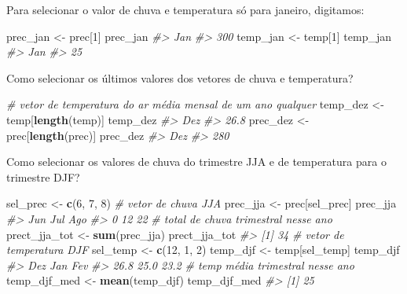 \documentclass[]{book}
\newenvironment{Shaded}{\begin{snugshade}}{\end{snugshade}}
\newcommand{\KeywordTok}[1]{\textcolor[rgb]{0.13,0.29,0.53}{\textbf{#1}}}
\newcommand{\DecValTok}[1]{\textcolor[rgb]{0.00,0.00,0.81}{#1}}
\newcommand{\StringTok}[1]{\textcolor[rgb]{0.31,0.60,0.02}{#1}}
\newcommand{\CommentTok}[1]{\textcolor[rgb]{0.56,0.35,0.01}{\textit{#1}}}
\newcommand{\NormalTok}[1]{#1}
\begin{document}
Para selecionar o valor de chuva e temperatura só para janeiro,
digitamos:

\begin{Shaded}
\begin{Highlighting}[]
\NormalTok{prec_jan <-}\StringTok{ }\NormalTok{prec[}\DecValTok{1}\NormalTok{]}
\NormalTok{prec_jan}
\CommentTok{#> Jan }
\CommentTok{#> 300}
\NormalTok{temp_jan <-}\StringTok{ }\NormalTok{temp[}\DecValTok{1}\NormalTok{]}
\NormalTok{temp_jan}
\CommentTok{#> Jan }
\CommentTok{#>  25}
\end{Highlighting}
\end{Shaded}

Como selecionar os últimos valores dos vetores de chuva e temperatura?

\begin{Shaded}
\begin{Highlighting}[]
\CommentTok{# vetor de temperatura do ar média mensal de um ano qualquer}
\NormalTok{temp_dez <-}\StringTok{ }\NormalTok{temp[}\KeywordTok{length}\NormalTok{(temp)]}
\NormalTok{temp_dez}
\CommentTok{#>  Dez }
\CommentTok{#> 26.8}
\NormalTok{prec_dez <-}\StringTok{ }\NormalTok{prec[}\KeywordTok{length}\NormalTok{(prec)]}
\NormalTok{prec_dez}
\CommentTok{#> Dez }
\CommentTok{#> 280}
\end{Highlighting}
\end{Shaded}

Como selecionar os valores de chuva do trimestre JJA e de temperatura
para o trimestre DJF?

\begin{Shaded}
\begin{Highlighting}[]
\NormalTok{sel_prec <-}\StringTok{ }\KeywordTok{c}\NormalTok{(}\DecValTok{6}\NormalTok{, }\DecValTok{7}\NormalTok{, }\DecValTok{8}\NormalTok{)}
\CommentTok{# vetor de chuva JJA}
\NormalTok{prec_jja <-}\StringTok{ }\NormalTok{prec[sel_prec]}
\NormalTok{prec_jja}
\CommentTok{#> Jun Jul Ago }
\CommentTok{#>   0  12  22}
\CommentTok{# total de chuva trimestral nesse ano}
\NormalTok{prect_jja_tot <-}\StringTok{ }\KeywordTok{sum}\NormalTok{(prec_jja)}
\NormalTok{prect_jja_tot}
\CommentTok{#> [1] 34}
\CommentTok{# vetor de temperatura DJF}
\NormalTok{sel_temp <-}\StringTok{ }\KeywordTok{c}\NormalTok{(}\DecValTok{12}\NormalTok{, }\DecValTok{1}\NormalTok{, }\DecValTok{2}\NormalTok{)}
\NormalTok{temp_djf <-}\StringTok{ }\NormalTok{temp[sel_temp]}
\NormalTok{temp_djf}
\CommentTok{#>  Dez  Jan  Fev }
\CommentTok{#> 26.8 25.0 23.2}
\CommentTok{# temp média trimestral nesse ano}
\NormalTok{temp_djf_med <-}\StringTok{ }\KeywordTok{mean}\NormalTok{(temp_djf)}
\NormalTok{temp_djf_med}
\CommentTok{#> [1] 25}
\end{Highlighting}
\end{Shaded}
\end{document}
